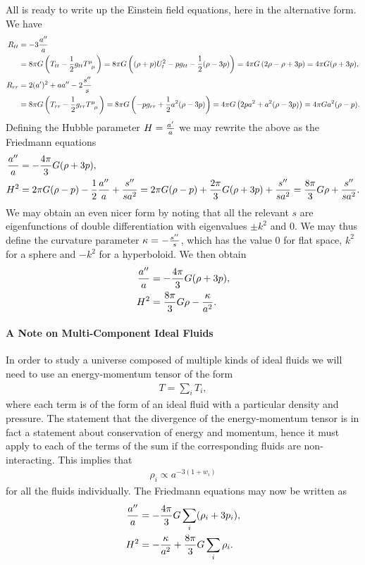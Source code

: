 All is ready to write up the Einstein field equations, here in the alternative form. We have
\begin{align*}
	R_{tt} &= -3\frac{a\pp}{a} \\
	       &= 8\pi G\left(T_{tt} - \frac{1}{2}g_{tt}\tensor{T}{^{\mu}_{\mu}}\right) = 8\pi G\left((\rho + p)U_{t}^{2} - pg_{tt} - \frac{1}{2}(\rho - 3p)\right) = 4\pi G\left(2\rho - \rho + 3p\right) = 4\pi G(\rho + 3p), \\
	R_{rr} &= 2(a\p)^{2} + aa\pp - 2\frac{s\pp}{s} \\
	       &= 8\pi G\left(T_{rr} - \frac{1}{2}g_{rr}\tensor{T}{^{\mu}_{\mu}}\right) = 8\pi G\left(-pg_{rr} + \frac{1}{2}a^{2}(\rho - 3p)\right) = 4\pi G\left(2pa^{2} + a^{2}(\rho - 3p)\right) = 4\pi Ga^{2}(\rho - p).
\end{align*}
Defining the Hubble parameter $H = \frac{a^{\prime}}{a}$ we may rewrite the above as the Friedmann equations
\begin{align*}
	\frac{a^{\prime\prime}}{a} &= -\frac{4\pi}{3}G(\rho + 3p), \\
	H^{2}          &= 2\pi G(\rho - p) - \frac{1}{2}\frac{a^{\prime\prime}}{a} + \frac{s^{\prime\prime}}{sa^{2}} = 2\pi G(\rho - p) + \frac{2\pi}{3}G(\rho + 3p) + \frac{s^{\prime\prime}}{sa^{2}} = \frac{8\pi}{3}G\rho + \frac{s^{\prime\prime}}{sa^{2}}.
\end{align*}
We may obtain an even nicer form by noting that all the relevant $s$ are eigenfunctions of double differentiation with eigenvalues $\pm k^{2}$ and $0$. We may thus define the curvature parameter $\kappa = -\frac{s^{\prime\prime}}{s}$, which has the value $0$ for flat space, $k^{2}$ for a sphere and $-k^{2}$ for a hyperboloid. We then obtain
\begin{align*}
	\frac{a^{\prime\prime}}{a} &= -\frac{4\pi}{3}G(\rho + 3p), \\
	H^{2}          &= \frac{8\pi}{3}G\rho - \frac{\kappa}{a^{2}}.
\end{align*}

\paragraph{A Note on Multi-Component Ideal Fluids}
In order to study a universe composed of multiple kinds of ideal fluids we will need to use an energy-momentum tensor of the form
\begin{align*}
	T = \sum\limits_{i}T_{i},
\end{align*}
where each term is of the form of an ideal fluid with a particular density and pressure. The statement that the divergence of the energy-momentum tensor is in fact a statement about conservation of energy and momentum, hence it must apply to each of the terms of the sum if the corresponding fluids are non-interacting. This implies that
\begin{align*}
	\rho_{i} \propto a^{-3(1 + w_{i})}
\end{align*}
for all the fluids individually. The Friedmann equations may now be written as
\begin{align*}
	\frac{a^{\prime\prime}}{a} &= -\frac{4\pi}{3}G\sum\limits_{i}(\rho_{i} + 3p_{i}), \\
	H^{2}          &=  - \frac{\kappa}{a^{2}} + \frac{8\pi}{3}G\sum\limits_{i}\rho_{i}.
\end{align*}

